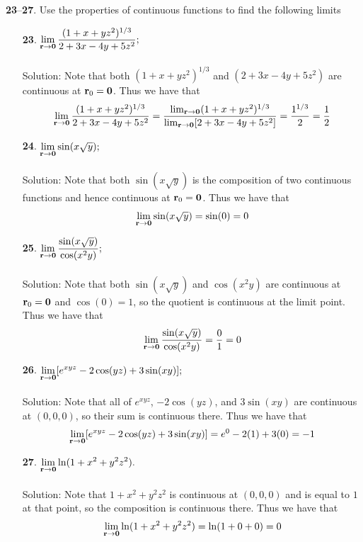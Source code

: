\documentclass[12pt]{amsbook}
\begin{document}
\noindent
{\small {\bf 23}--{\bf 27}}. Use the properties of continuous functions to find the following limits
\begin{enumerate}
  \item[{\small\bf 23}.] $\! \begin{aligned}[t]
 \lim_{{\bf r} \rightarrow {\bf 0}}\frac{(1+x+yz^2)^{1/3}}{2+3x-4y+5z^2};  
\end{aligned}$ 
  \\
  \\
  {\sc Solution}: Note that both $(1+x+yz^2)^{1/3}$ and $(2+3x-4y+5z^2)$ are continuous at ${\bf r}_0={\bf 0}$. Thus we have that
  $$\lim_{{\bf r} \rightarrow {\bf 0}}\frac{(1+x+yz^2)^{1/3}}{2+3x-4y+5z^2}=\frac{\lim_{{\bf r} \rightarrow {\bf 0}}(1+x+yz^2)^{1/3}}{\lim_{{\bf r} \rightarrow {\bf 0}}[2+3x-4y+5z^2]}=\frac{1^{1/3}}{2}=\frac{1}{2}$$
  \item[{\small\bf 24}.] $\! \begin{aligned}[t]
 \lim_{{\bf r} \rightarrow {\bf 0}}\sin(x\sqrt{y});  
\end{aligned}$ 
  \\
  \\
  {\sc Solution}: Note that both $\sin(x\sqrt{y})$ is the composition of two continuous functions and hence continuous at ${\bf r}_0={\bf 0}$. Thus we have that
  $$\lim_{{\bf r} \rightarrow {\bf 0}}\sin(x\sqrt{y})=\sin(0)=0$$
  \item[{\small\bf 25}.] $\! \begin{aligned}[t]
 \lim_{{\bf r} \rightarrow {\bf 0}}\frac{\sin(x\sqrt{y})}{\cos(x^2y)};  
\end{aligned}$ 
  \\
  \\
  {\sc Solution}: Note that both $\sin(x\sqrt{y})$ and $\cos(x^2y)$ are continuous at ${\bf r}_0={\bf 0}$ and $\cos(0)=1$, so the quotient is continuous at the limit point. Thus we have that
  $$\lim_{{\bf r} \rightarrow {\bf 0}}\frac{\sin(x\sqrt{y})}{\cos(x^2y)}=\frac{0}{1}=0$$
  \item[{\small\bf 26}.] $\! \begin{aligned}[t]
 \lim_{{\bf r} \rightarrow {\bf 0}}[e^{xyz}-2\cos(yz)+3\sin(xy)];  
\end{aligned}$ 
  \\
  \\
  {\sc Solution}: Note that all of $e^{xyz}$, $-2\cos(yz)$, and $3\sin(xy)$ are continuous at $(0,0,0)$, so their sum is continuous there. Thus we have that
  $$\lim_{{\bf r} \rightarrow {\bf 0}}[e^{xyz}-2\cos(yz)+3\sin(xy)]=e^{0}-2(1)+3(0)=-1$$
  \item[{\small\bf 27}.] $\! \begin{aligned}[t]
 \lim_{{\bf r} \rightarrow {\bf 0}}\ln(1+x^2+y^2z^2).  
\end{aligned}$ 
  \\
  \\
  {\sc Solution}: Note that $1+x^2+y^2z^2$ is continuous at $(0,0,0)$ and is equal to $1$ at that point, so the composition is continuous there. Thus we have that
$$\lim_{{\bf r} \rightarrow {\bf 0}}\ln(1+x^2+y^2z^2)=\ln(1+0+0)=0$$
\end{enumerate}
\end{document}
